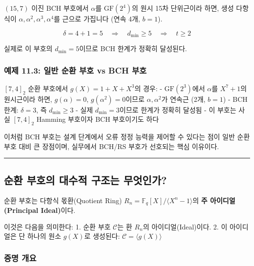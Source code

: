 \documentclass[
  oneside]{article}
\begin{document}
\((15, 7)\) 이진 BCH 부호에서 \(\alpha\)를 \(\text{GF}(2^4)\)의 원시
15차 단위근이라 하면, 생성 다항식이
\(\alpha, \alpha^2, \alpha^3, \alpha^4\)를 근으로 가집니다 (연속 4개,
\(b=1\)).

\[\delta = 4 + 1 = 5 \quad \Rightarrow \quad d_{\min} \geq 5 \quad \Rightarrow \quad t \geq 2\]

실제로 이 부호의 \(d_{\min} = 5\)이므로 BCH 한계가 정확히 달성된다.

\subsubsection{예제 11.3: 일반 순환 부호 vs BCH
부호}\label{uxc608uxc81c-11.3-uxc77cuxbc18-uxc21cuxd658-uxbd80uxd638-vs-bch-uxbd80uxd638}

\([7, 4]_2\) 순환 부호에서 \(g(X) = 1 + X + X^3\)의 경우: -
\(\text{GF}(2^3)\)에서 \(\alpha\)를 \(X^7 + 1\)의 원시근이라 하면,
\(g(\alpha) = 0\), \(g(\alpha^2) = 0\)이므로 \(\alpha, \alpha^2\)가
연속근 (2개, \(b=1\)) - BCH 한계: \(\delta = 3\), 즉 \(d_{\min} \geq 3\)
- 실제 \(d_{\min} = 3\)이므로 한계가 정확히 달성됨 - 이 부호는 사실
\([7, 4]_2\) Hamming 부호이자 BCH 부호이기도 하다

이처럼 BCH 부호는 설계 단계에서 오류 정정 능력을 제어할 수 있다는 점이
일반 순환 부호 대비 큰 장점이며, 실무에서 BCH/RS 부호가 선호되는 핵심
이유이다.

\begin{center}\rule{0.5\linewidth}{0.5pt}\end{center}

\subsection{순환 부호의 대수적 구조는
무엇인가?}\label{uxc21cuxd658-uxbd80uxd638uxc758-uxb300uxc218uxc801-uxad6cuxc870uxb294-uxbb34uxc5c7uxc778uxac00}

순환 부호는 다항식 몫환(Quotient Ring)
\(R_n = \mathbb{F}_q[X]/ \langle X^n - 1 \rangle\)의 \textbf{주
아이디얼(Principal Ideal)}이다.

이것은 다음을 의미한다: 1. 순환 부호 \(\mathcal{C}\)는 환 \(R_n\)의
아이디얼(Ideal)이다. 2. 이 아이디얼은 단 하나의 원소 \(g(X)\)로
생성된다: \(\mathcal{C} = \langle g(X) \rangle\)

\subsubsection{증명 개요}\label{uxc99duxba85-uxac1cuxc694}
\end{document}
